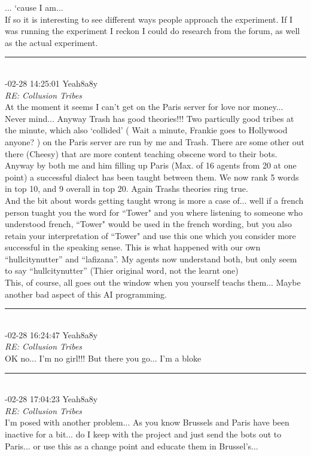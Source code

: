 \begin{mail}
... `cause I am...\\
If so it is interesting to see different ways people approach the experiment. If I was running the experiment I reckon I could do research from the forum, as well as the actual experiment.\\
\rule{0.8\textwidth}{.4pt}\\
{-02-28 14:25:01 Yeah8a8y}\\
{\itshape RE: Collusion Tribes}\\
At the moment it seems I can't get on the Paris server for love nor money... Never mind... Anyway Trash has good theories!!! Two particully good tribes at the minute, which also `collided' ( Wait a minute, Frankie goes to Hollywood anyone? ) on the Paris server are run by me and Trash. There are some other out there (Cheesy) that are more content teaching obscene word to their bots. Anyway by both me and him filling up Paris (Max. of 16 agents from 20 at one point) a successful dialect has been taught between them. We now rank 5 words in top 10, and 9 overall in top 20.  Again Trashs theories ring true. \\
And the bit about words getting taught wrong is more a case of... well if a french person tuaght you the word for ``Tower" and you where listening  to someone who understood french, ``Tower" would be used in the french wording, but you also retain your interpretation of ``Tower" and use this one which you consider more successful in the speaking sense. This is what happened with our own ``hullcitynutter'' and ``lafizana''. My agents now understand both, but only seem to say ``hullcitynutter''  (Thier original word, not the learnt one)\\
This, of course, all goes out the window  when you yourself teachs them... Maybe another bad aspect of this AI programming.\\
\rule{0.8\textwidth}{.4pt}\\
{-02-28 16:24:47 Yeah8a8y}\\
{\itshape RE: Collusion  Tribes}\\
OK no... I'm no girl!!! But there you go... I'm a bloke\\
\rule{0.8\textwidth}{.4pt}\\
{-02-28 17:04:23 Yeah8a8y}\\
{\itshape RE: Collusion  Tribes}\\
I'm posed with another problem... As you know Brussels and Paris have been inactive for a bit... do I keep with the project and just send the bots out to Paris... or use this as a change point and educate them in Brussel's...\\

\end{mail}

